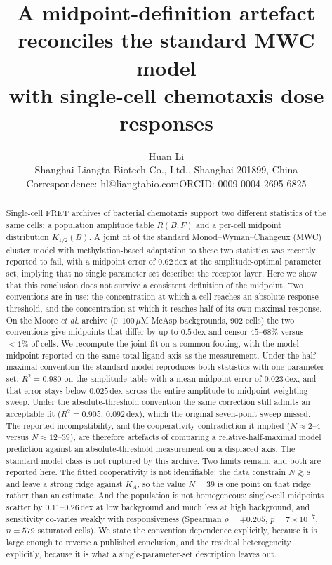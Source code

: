 ﻿\documentclass[11pt,a4paper]{article}
\title{\textbf{A midpoint-definition artefact reconciles the standard MWC model\\
with single-cell chemotaxis dose responses}}
\author{Huan Li\\[2pt]
\small Shanghai Liangta Biotech Co., Ltd., Shanghai 201899, China\\
\small Correspondence: hl@liangtabio.com\quad ORCID: 0009-0004-2695-6825}
\date{}
\newcommand{\dex}{\ensuremath{\,\mathrm{dex}}}
\newcommand{\Khalf}{\ensuremath{K_{1/2}}}
\begin{document}
\maketitle

\begin{abstract}
\noindent
Single-cell FRET archives of bacterial chemotaxis support two different statistics of the same
cells: a population amplitude table $R(B,F)$ and a per-cell midpoint distribution $\Khalf(B)$.
A joint fit of the standard Monod--Wyman--Changeux (MWC) cluster model with methylation-based
adaptation to these two statistics was recently reported to fail, with a midpoint error of
$0.62\dex$ at the amplitude-optimal parameter set, implying that no single parameter set describes
the receptor layer. Here we show that this conclusion does not survive a consistent definition of
the midpoint. Two conventions are in use: the concentration at which a cell reaches an absolute
response threshold, and the concentration at which it reaches half of its own maximal response.
On the Moore \emph{et al.} archive ($0$--$100\,\mu$M MeAsp backgrounds, 902 cells) the two
conventions give midpoints that differ by up to $0.5\dex$ and censor $45$--$68\%$ versus
$<1\%$ of cells. We recompute the joint fit on a common footing, with the model midpoint reported
on the same total-ligand axis as the measurement. Under the half-maximal convention the standard
model reproduces both statistics with one parameter set: $R^2=0.980$ on the amplitude table with a
mean midpoint error of $0.023\dex$, and that error stays below $0.025\dex$ across the entire
amplitude-to-midpoint weighting sweep. Under the absolute-threshold convention the same
correction still admits an acceptable fit ($R^2=0.905$, $0.092\dex$), which the original
seven-point sweep missed. The reported incompatibility, and the cooperativity contradiction it
implied ($N\approx2$--$4$ versus $N\approx12$--$39$), are therefore artefacts of comparing a
relative-half-maximal model prediction against an absolute-threshold measurement on a displaced
axis. The standard model class is not ruptured by this archive. Two limits remain, and both are
reported here. The fitted cooperativity is not identifiable: the data constrain $N\gtrsim8$ and
leave a strong ridge against $K_A$, so the value $N=39$ is one point on that ridge rather than an
estimate. And the population is not homogeneous: single-cell midpoints scatter by
$0.11$--$0.26\dex$ at low background and much less at high background, and sensitivity co-varies
weakly with responsiveness (Spearman $\rho=+0.205$, $p=7\times10^{-7}$, $n=579$ saturated cells). We
state the convention dependence explicitly, because it is large enough to reverse a published
conclusion, and the residual heterogeneity explicitly, because it is what a single-parameter-set
description leaves out.
\end{abstract}
\end{document}
